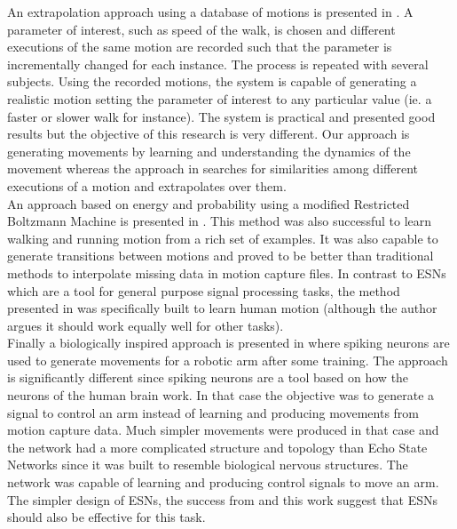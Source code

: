 \documentclass[letterpaper,9pt]{article}
\begin{document}
An extrapolation approach using a database of motions is presented in \cite{Gordon04StyleMotionSynthesis}. A parameter of interest, such as speed of the walk, is chosen and different executions of the same motion are recorded such that the parameter is incrementally changed for each instance. The process is repeated with several subjects. Using the recorded motions, the system is capable of generating a realistic motion setting the parameter of interest to any particular value (ie. a faster or slower walk for instance). The system is practical and presented good results but the objective of this research is very different. Our approach is generating movements by learning and understanding the dynamics of the movement whereas the approach in \cite{Gordon04StyleMotionSynthesis} searches for similarities among different executions of a motion and extrapolates over them.  \\

An approach based on energy and probability using a modified Restricted Boltzmann Machine is presented in \cite{TaylorModelingHuman}. This method was also successful to learn walking and running motion from a rich set of examples. It was also capable to generate transitions between motions and proved to be better than traditional methods to interpolate missing data in motion capture files. In contrast to ESNs which are a tool for general purpose signal processing tasks, the method presented in \cite{TaylorModelingHuman} was specifically built to learn human motion (although the author argues it should work equally well for other tasks). \\

Finally a biologically inspired approach is presented in \cite{Joshi05MovementGeneration} where spiking neurons are used to generate movements for a robotic arm after some training. The approach is significantly different since spiking neurons are a tool based on how the neurons of the human brain work. In that case the objective was to generate a signal to control an arm instead of learning and producing movements from motion capture data. Much simpler movements were produced in that case and the network had a more complicated structure and topology than Echo State Networks since it was built to resemble biological nervous structures. The network was capable of learning and producing control signals to move an arm. The simpler design of ESNs, the success from \cite{GentHumanMotion} and this work suggest that ESNs should also be effective for this task.\\
\end{document}
